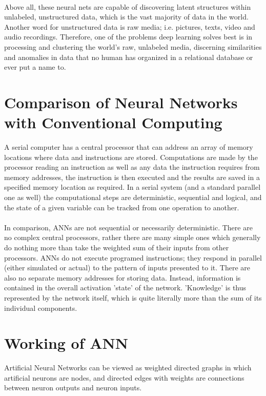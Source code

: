 \documentclass[a4paper,12pt]{report}
\begin{document}
\paragraph{}
Above all, these neural nets are capable of discovering latent structures within unlabeled, unstructured data, which is the vast majority of data in the world. Another word for unstructured data is raw media; i.e. pictures, texts, video and audio recordings. Therefore, one of the problems deep learning solves best is in processing and clustering the world’s raw, unlabeled media, discerning similarities and anomalies in data that no human has organized in a relational database or ever put a name to.

\section{Comparison of Neural Networks with Conventional Computing}
A serial computer has a central processor that can address an array of memory locations where data and instructions are stored. Computations are made by the processor reading an instruction as well as any data the instruction requires from memory addresses, the instruction is then executed and the results are saved in a specified memory location as required. In a serial system (and a standard parallel one as well) the computational steps are deterministic, sequential and logical, and the state of a given variable can be tracked from one operation to another.

\paragraph{}
In comparison, ANNs are not sequential or necessarily deterministic. There are no complex central processors, rather there are many simple ones which generally do nothing more than take the weighted sum of their inputs from other processors. ANNs do not execute programed instructions; they respond in parallel (either simulated or actual) to the pattern of inputs presented to it. There are also no separate memory addresses for storing data. Instead, information is contained in the overall activation 'state' of the network. 'Knowledge' is thus represented by the network itself, which is quite literally more than the sum of its individual components.

\section{Working of ANN}
Artificial Neural Networks can be viewed as weighted directed graphs in which artificial neurons are nodes, and directed edges with weights are connections between neuron outputs and neuron inputs.
\end{document}

